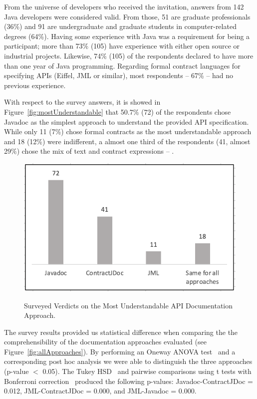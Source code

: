 From the universe of developers who received the invitation, answers from 142 Java developers were considered valid.
From those, 51 are graduate professionals (36\%) and 91 are undergraduate and graduate students in computer-related degrees (64\%).
Having some experience with Java was a requirement for being a participant; more than 73\% (105) have experience with either open source or industrial projects. Likewise, 74\% (105) of the respondents declared to have more than one year of Java programming.
Regarding formal contract languages for specifying APIs (Eiffel, JML or similar), most respondents -- 67\% -- had no previous experience. 


With respect to the survey answers, it is showed in Figure~\ref{fig:mostUnderstandable} that 50.7\% (72) of the respondents chose Javadoc as the simplest approach to understand the provided API specification. 
While only 11 (7\%) chose formal contracts as the most understandable approach and 18 (12\%) were indifferent, a almost one third of the respondents (41, almost 29\%) chose the mix of text and contract expressions -- \contractjdoc{}.


\begin{figure}
\centering
\includegraphics[width=0.7\linewidth]{figs/mostUnderstandable.png}
\label{fig:mostUnderstandable}
\caption{Surveyed Verdicts on the Most Understandable API Documentation Approach.}
\label{fig:surveyResults}
\end{figure}


The survey results provided us statistical difference when comparing the the
comprehensibility of the documentation approaches evaluated (see
Figure~\ref{fig:allApproaches}). By performing an Oneway ANOVA test~\cite{statistical} and
a corresponding post hoc analysis we were able to distinguish the three
approaches (p-value $<$ 0.05).
The Tukey HSD~\cite{statistical} and pairwise comparisons using t tests
with Bonferroni correction~\cite{statistical} produced the following p-values:
Javadoc-ContractJDoc = 0.012, JML-ContractJDoc = 0.000, and JML-Javadoc = 0.000.





